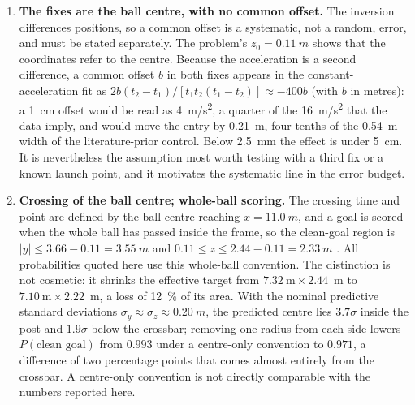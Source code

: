 \begin{enumerate}[label=\textbf{A\arabic*},leftmargin=*,itemsep=6pt]
\item \textbf{The fixes are the ball centre, with no common offset.}
The inversion differences positions, so a common offset is a systematic, not a
random, error, and must be stated separately. The problem's
$z_0=\SI{0.11}{m}$ shows that the coordinates refer to the centre. Because the
acceleration is a second difference, a common offset $b$ in both fixes appears
in the constant-acceleration fit as
$2b(t_2-t_1)/[t_1t_2(t_1-t_2)]\approx-400b$ (with $b$ in metres): a
\SI{1}{cm} offset would be read as \SI{4}{m/s^2}, a quarter of the
\SI{16}{m/s^2} that the data imply, and would move the entry by \SI{0.21}{m},
four-tenths of the \SI{0.54}{m} width of the literature-prior control. Below
\SI{2.5}{mm} the effect is under \SI{5}{cm}. It is nevertheless
the assumption most worth testing with a third fix or a known launch point,
and it motivates the systematic line in the error budget.

\item \textbf{Crossing of the ball centre; whole-ball scoring.}
The crossing time and point are defined by the ball centre reaching
$x=\SI{11.0}{m}$, and a goal is scored when the whole ball has passed inside
the frame, so the clean-goal region is
$|y|\le 3.66-0.11=\SI{3.55}{m}$ and $0.11\le z\le 2.44-0.11=\SI{2.33}{m}$
\citep{ifab2025}. All probabilities quoted here use this whole-ball
convention. The distinction is not cosmetic: it shrinks the effective target
from $7.32~\text{m}\times2.44$~m to $7.10~\text{m}\times2.22$~m, a loss of
\SI{12}{\percent} of its area. With the nominal predictive standard deviations
$\sigma_y\approx\sigma_z\approx\SI{0.20}{m}$, the predicted centre lies
$3.7\sigma$ inside the post and $1.9\sigma$ below the crossbar; removing one
radius from each side lowers $P(\text{clean goal})$ from $0.993$ under a
centre-only convention to $0.971$, a difference of two percentage points that
comes almost entirely from the crossbar. A centre-only convention is not
directly comparable with the numbers reported here.

\end{enumerate}
